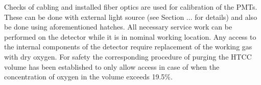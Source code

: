 Checks of cabling and installed fiber optics are used for calibration of the PMTs. These can be done with external light source (see Section ... for details) and also be done using aforementioned hatches. All necessary service work can be performed on the detector while it is in nominal working location. Any access to the internal components of the detector require replacement of the working gas with dry oxygen. For safety the corresponding procedure of purging the HTCC volume has been established to only allow access in case of when the concentration of oxygen in the volume exceeds 19.5\%.